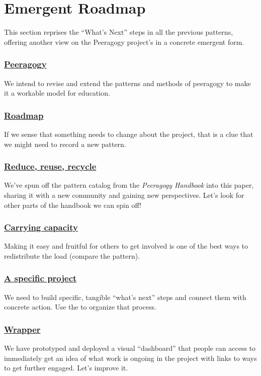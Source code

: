 \section{Emergent Roadmap} \label{sec:Distributed_Roadmap}

This section reprises the ``What's Next'' steps in all the previous
patterns, offering another view on the Peeragogy project's
 in a concrete emergent form.

\subsubsection*{\hyperref[sec:Peeragogy]{Peeragogy}} 
 We intend to revise and extend the patterns and methods of peeragogy to make it a workable model for education.

\subsubsection*{\hyperref[sec:Roadmap]{Roadmap}} If we sense that something needs to change about the project, that is a clue that we might need to record a new pattern.

\subsubsection*{\hyperref[sec:Use_or_make]{Reduce, reuse, recycle}}
We've spun off the pattern catalog from the \emph{Peeragogy Handbook} into this paper, sharing it with a new community and gaining new perspectives.  Let's look for other parts of the handbook we can spin off!

\subsubsection*{\hyperref[sec:Carrying_capacity]{Carrying capacity}} 
Making it easy and fruitful for others to get involved is one of the best ways to
redistribute the load (compare the
pattern).

\subsubsection*{\hyperref[sec:A_specific_project]{A specific project}}
We need to build specific, tangible ``what's next'' steps and connect them with concrete action. Use the  to organize that process. 

\subsubsection*{\hyperref[sec:Wrapper]{Wrapper}}
We have prototyped and deployed a visual ``dashboard'' that people can access to immediately get an idea of what work is ongoing in the project with links to ways to get further engaged.  Let's improve it.

